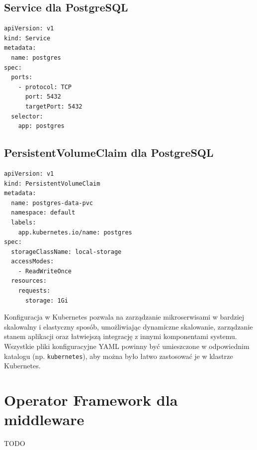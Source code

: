 \documentclass[polish]{aghengthesis}
\begin{document}
\subsection{Service dla PostgreSQL}

\begin{lstlisting}[caption=Service dla PostgreSQL]
apiVersion: v1
kind: Service
metadata:
  name: postgres
spec:
  ports:
    - protocol: TCP
      port: 5432
      targetPort: 5432
  selector:
    app: postgres
\end{lstlisting}

\subsection{PersistentVolumeClaim dla PostgreSQL}

\begin{lstlisting}[caption=PersistentVolumeClaim dla PostgreSQL]
apiVersion: v1
kind: PersistentVolumeClaim
metadata:
  name: postgres-data-pvc
  namespace: default
  labels:
    app.kubernetes.io/name: postgres
spec:
  storageClassName: local-storage
  accessModes:
    - ReadWriteOnce
  resources:
    requests:
      storage: 1Gi
\end{lstlisting}

Konfiguracja w Kubernetes pozwala na zarządzanie mikroserwisami w bardziej skalowalny i elastyczny sposób, umożliwiając dynamiczne skalowanie, zarządzanie stanem aplikacji oraz łatwiejszą integrację z innymi komponentami systemu. Wszystkie pliki konfiguracyjne YAML powinny być umieszczone w odpowiednim katalogu (np. \texttt{kubernetes}), aby można było łatwo zastosować je w klastrze Kubernetes.

\section{Operator Framework dla middleware}
TODO
\end{document}
